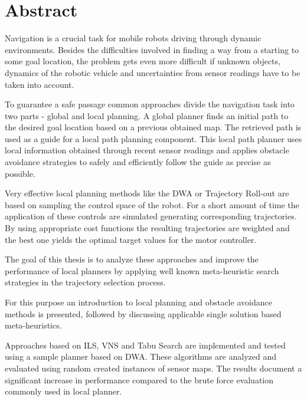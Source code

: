 \begingroup
\let\clearpage\relax
\let\cleardoublepage\relax
\let\cleardoublepage\relax

\chapter*{Abstract}
Navigation is a crucial task for mobile robots driving through dynamic environments.
Besides the difficulties involved in finding a way from a starting to some goal location, the problem gets even more difficult if unknown objects, dynamics of the robotic vehicle and uncertainties from sensor readings have to be taken into account.

To guarantee a safe passage common approaches divide the navigation task into two parts - global and local planning.
A global planner finds an initial path to the desired goal location based on a previous obtained map. The retrieved path is used as a guide for a local path planning component.
This local path planner uses local information obtained through recent sensor readings and applies obstacle avoidance strategies to safely and efficiently follow the guide as precise as possible. 

Very effective local planning methods like the \ac{DWA} or Trajectory Roll-out are based on sampling the control space of the robot. For a short amount of time the application of these controls are simulated generating corresponding trajectories.
By using appropriate cost functions the resulting trajectories are weighted and the best one yields the optimal target values for the motor controller.

The goal of this thesis is to analyze these approaches and improve the performance of local planners by applying well known meta-heuristic search strategies in the trajectory selection process.

For this purpose an introduction to local planning and obstacle avoidance methods is presented,  followed by discussing applicable single solution based meta-heuristics. 

Approaches based on \ac{ILS}, \ac{VNS} and Tabu Search are implemented and tested using a sample planner based on \ac{DWA}. These algorithms are analyzed and evaluated using random created instances of sensor maps. The results document a significant increase in performance compared to the brute force evaluation commonly used in local planner. 

